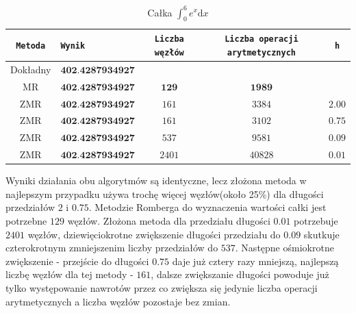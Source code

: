 \documentclass[11pt,leqno]{article}
\begin{document}
\begin{center}\begin{table}[ht]\begin{center}
    \caption{Całka $\int_{0}^{6}e^x\mathrm{d}x$}
    \begin{tabular}{|c|l|c|c|c|} \hline
        \texttt{Metoda} & \texttt{Wynik}            & \texttt{Liczba węzłów} & \texttt{Liczba operacji arytmetycznych} & \texttt{h} \\ \hline
        Dokładny        & $\textbf{402.4287934927}$ &                        &                                         &            \\ \hline
        MR              & $\textbf{402.4287934927}$ & $\textbf{129}$         & $\textbf{1989}$                         &            \\ \hline
        ZMR             & $\textbf{402.4287934927}$ & $161$                  & $3384$                                  & $2.00$     \\ \hline
        ZMR             & $\textbf{402.4287934927}$ & $161$                  & $3102$                                  & $0.75$     \\ \hline
        ZMR             & $\textbf{402.4287934927}$ & $537$                  & $9581$                                  & $0.09$     \\ \hline
        ZMR             & $\textbf{402.4287934927}$ & $2401$                 & $40828$                                 & $0.01$     \\ \hline
    \end{tabular}
\end{center}\end{table}\end{center}

Wyniki działania obu algorytmów są identyczne, lecz złożona metoda w najlepszym
przypadku używa trochę więcej węzłów(około 25\%) dla długości przedziałów $2$
i $0.75$. Metodzie Romberga do wyznaczenia wartości całki jest potrzebne $129$
węzłów. Złożona metoda dla przedziału długości $0.01$ potrzebuje $2401$ węzłów,
dziewięciokrotne zwiększenie długości przedziału do $0.09$ skutkuje czterokrotnym
zmniejszenim liczby przedziałów do $537$. Następne ośmiokrotne zwiększenie -
przejście do długości $0.75$ daje już cztery razy mniejszą, najlepszą liczbę
węzłów dla tej metody - $161$, dalsze zwiększanie długości powoduje już
tylko występowanie nawrotów przez co zwiększa się jedynie liczba operacji
arytmetycznych a liczba węzłów pozostaje bez zmian.
\end{document}
